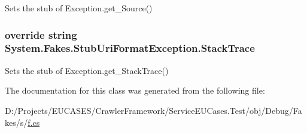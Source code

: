Sets the stub of Exception.\-get\-\_\-\-Source()

\hypertarget{class_system_1_1_fakes_1_1_stub_uri_format_exception_a65087227020166416c334954e19b2da6}{
\subsubsection[{Stack\-Trace}]{\setlength{\rightskip}{0pt plus 5cm}override string System.\-Fakes.\-Stub\-Uri\-Format\-Exception.\-Stack\-Trace\hspace{0.3cm}{\ttfamily [get]}}}\label{class_system_1_1_fakes_1_1_stub_uri_format_exception_a65087227020166416c334954e19b2da6}


Sets the stub of Exception.\-get\-\_\-\-Stack\-Trace()



The documentation for this class was generated from the following file\-:\begin{DoxyCompactItemize}
\item 
D\-:/\-Projects/\-E\-U\-C\-A\-S\-E\-S/\-Crawler\-Framework/\-Service\-E\-U\-Cases.\-Test/obj/\-Debug/\-Fakes/s/\hyperlink{s_2f_8cs}{f.\-cs}\end{DoxyCompactItemize}
